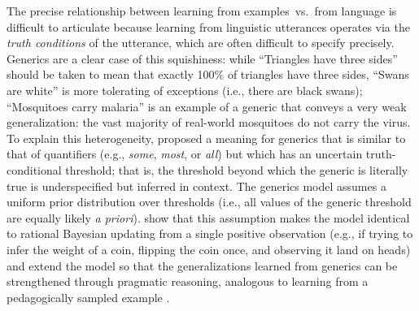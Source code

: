 \documentclass[10pt,letterpaper]{article}
\newcommand{\mht}[1]{\textcolor{Blue}{[mht: #1]}}
\begin{document}
The precise relationship between learning from examples~vs.~from language is difficult to articulate because learning from linguistic utterances operates via the \emph{truth conditions} of the utterance, which are often difficult to specify precisely. %
Generics are a clear case of this squishiness:  while ``Triangles have three sides'' should be taken to mean that exactly 100\% of triangles have three sides, ``Swans are white'' is more tolerating of exceptions (i.e., there are black swans); ``Mosquitoes carry malaria'' is an example of a generic that conveys a very weak generalization: the vast majority of real-world mosquitoes do not carry the virus. 
To explain this heterogeneity,  proposed a meaning for generics that is similar to that of quantifiers (e.g., \emph{some}, \emph{most}, or \emph{all}) but which has an uncertain truth-conditional threshold; that is, the threshold beyond which the generic is literally true is underspecified but inferred in context.
The generics model assumes a uniform prior distribution over thresholds (i.e., all values of the generic threshold are equally likely \emph{a priori}).
 show that this assumption makes the model identical to rational Bayesian updating from a single positive observation (e.g., if trying to infer the weight of a coin, flipping the coin once, and observing it land on heads) and extend the model so that the generalizations learned from generics can be strengthened through pragmatic reasoning, analogous to learning from a pedagogically sampled example \cite{shafto2012learning}. 

%
\end{document}

